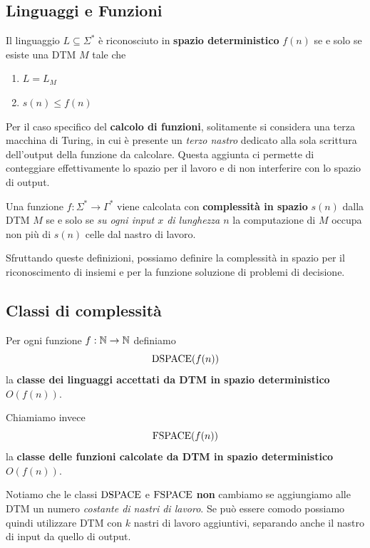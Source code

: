 \subsection{Linguaggi e Funzioni}

Il linguaggio $L \subseteq \Sigma^\ast$ è riconosciuto in \textbf{spazio deterministico} $f(n)$ se e solo se esiste una DTM $M$ tale che
\begin{enumerate}
	\item $L = L_M$
    
	\item $s(n) \leq f(n)$
\end{enumerate}

Per il caso specifico del \textbf{calcolo di funzioni}, solitamente si considera una terza macchina di Turing, in cui è presente un \textit{terzo nastro} dedicato alla sola scrittura dell'output della funzione da calcolare. Questa aggiunta ci permette di conteggiare effettivamente lo spazio per il lavoro e di non interferire con lo spazio di output. 

Una funzione $f: \Sigma^\ast \rightarrow \Gamma^\ast$ viene calcolata con \textbf{complessità in spazio} $s(n)$ dalla DTM $M$ se e solo se \textit{su ogni input $x$ di lunghezza $n$} la computazione di $M$ occupa non più di $s(n)$ celle dal nastro di lavoro.

Sfruttando queste definizioni, possiamo definire la complessità in spazio per il riconoscimento di insiemi e per la funzione soluzione di problemi di decisione.

\subsection{Classi di complessità}

Per ogni funzione $f: \mathbb{N} \rightarrow \mathbb{N}$ definiamo 
$$ \text{DSPACE} (f(n)) $$
la \textbf{classe dei linguaggi accettati da DTM in spazio deterministico} $O(f(n))$. 

Chiamiamo invece
$$ \text{FSPACE} (f(n)) $$
la \textbf{classe delle funzioni calcolate da DTM in spazio deterministico} $O(f(n))$.

Notiamo che le classi $\text{DSPACE}$ e $\text{FSPACE}$ \textbf{non} cambiamo se aggiungiamo alle DTM un numero \textit{costante di nastri di lavoro}. Se può essere comodo possiamo quindi utilizzare DTM con $k$ nastri di lavoro aggiuntivi, separando anche il nastro di input da quello di output.

